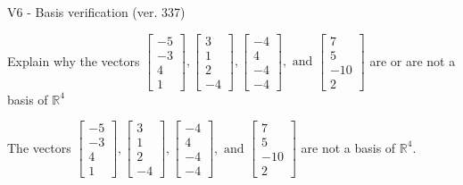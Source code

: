 \begin{exercise}
  \begin{exerciseTitle}V6 - Basis verification (ver. 337)\end{exerciseTitle}
  \begin{exerciseStatement}
    Explain why the vectors \(\left[\begin{array}{r}
-5 \\
-3 \\
4 \\
1
\end{array}\right] , \left[\begin{array}{r}
3 \\
1 \\
2 \\
-4
\end{array}\right] , \left[\begin{array}{r}
-4 \\
4 \\
-4 \\
-4
\end{array}\right] , \text{ and } \left[\begin{array}{r}
7 \\
5 \\
-10 \\
2
\end{array}\right]\) are or are not a basis of \(\mathbb{R}^4\)	


  \end{exerciseStatement}
  \begin{exerciseAnswer}
   The vectors \(\left[\begin{array}{r}
-5 \\
-3 \\
4 \\
1
\end{array}\right] , \left[\begin{array}{r}
3 \\
1 \\
2 \\
-4
\end{array}\right] , \left[\begin{array}{r}
-4 \\
4 \\
-4 \\
-4
\end{array}\right] , \text{ and } \left[\begin{array}{r}
7 \\
5 \\
-10 \\
2
\end{array}\right]\) 
  	 are not  a basis of \(\mathbb{R}^4\).
  


  \end{exerciseAnswer}
\end{exercise}